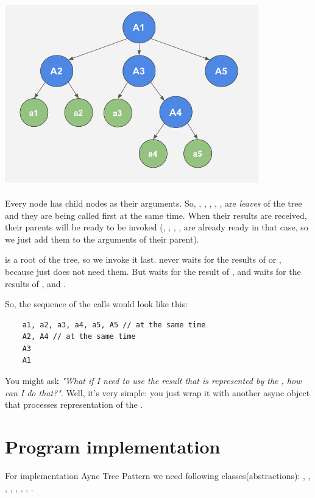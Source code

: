 \documentclass{article}
\begin{document}
\vspace*{10px}
\includegraphics[width=11cm, height=8cm]{async-tree.png}
\vspace*{10px}

Every node has child nodes as their arguments. So, , , , , ,  are \textit{leaves} of the tree and they are being called first at the same time. When their results are received, their parents will be ready to be invoked (, , , ,  are already ready in that case, so we just add them to the arguments of their parent).

 is a root of the tree, so we invoke it last.  never waits for the results of  or , because  just does not need them. But  waits for the result of , and  waits for the results of ,  and .

So, the sequence of the calls would look like this:

\begin{verbatim}
    a1, a2, a3, a4, a5, A5 // at the same time
    A2, A4 // at the same time
    A3
    A1
\end{verbatim}

You might ask \textit{"What if I need to use the result that is represented by the , how can I do that?"}. Well, it's very simple: you just wrap it with another async object that processes representation of the .

\section{Program implementation}

For implementation Aync Tree Pattern we need following classes(abstractions): , ,
, , , , , .
\end{document}

